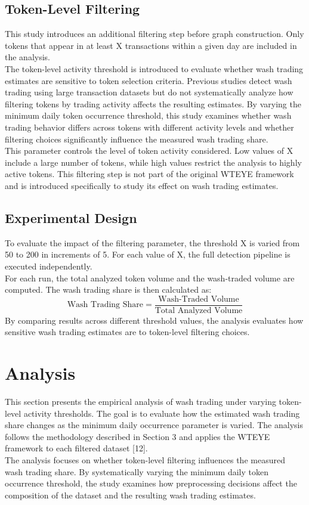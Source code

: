 \documentclass[language=english,thesis=bachelor,nosecondtitle,faculty=cb,onesided,12pt]{hsmw-thesis}
\begin{document}
	\section{Token-Level Filtering}
This study introduces an additional filtering step before graph construction. Only tokens that appear in at least X transactions within a given day are included in the analysis.\\
The token-level activity threshold is introduced to evaluate whether wash trading estimates are sensitive to token selection criteria. Previous studies detect wash trading using large transaction datasets but do not systematically analyze how filtering tokens by trading activity affects the resulting estimates. By varying the minimum daily token occurrence threshold, this study examines whether wash trading behavior differs across tokens with different activity levels and whether filtering choices significantly influence the measured wash trading share.\\
This parameter controls the level of token activity considered. Low values of X include a large number of tokens, while high values restrict the analysis to highly active tokens. This filtering step is not part of the original WTEYE framework and is introduced specifically to study its effect on wash trading estimates.\\
	\section{Experimental Design}
To evaluate the impact of the filtering parameter, the threshold X is varied from 50 to 200 in increments of 5. For each value of X, the full detection pipeline is executed independently.\\
For each run, the total analyzed token volume and the wash-traded volume are computed. The wash trading share is then calculated as:\\
\begin{equation}
    \text{Wash Trading Share} = \frac{\text{Wash-Traded Volume}}{\text{Total Analyzed Volume}}
    \label{eq:wash_trading_share}
\end{equation}
By comparing results across different threshold values, the analysis evaluates how sensitive wash trading estimates are to token-level filtering choices.

	\chapter{Analysis}
This section presents the empirical analysis of wash trading under varying token-level activity thresholds. The goal is to evaluate how the estimated wash trading share changes as the minimum daily occurrence parameter is varied. The analysis follows the methodology described in Section 3 and applies the WTEYE framework to each filtered dataset [12].\\
The analysis focuses on whether token-level filtering influences the measured wash trading share. By systematically varying the minimum daily token occurrence threshold, the study examines how preprocessing decisions affect the composition of the dataset and the resulting wash trading estimates.
\end{document}
